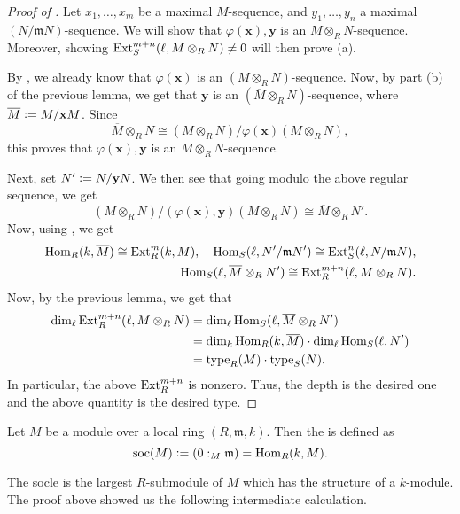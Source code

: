 \documentclass[12pt]{article}
\begin{document}
\begin{proof}[Proof of ]
	Let $x_{1}, \ldots, x_{m}$ be a maximal $M$-sequence, and $y_{1}, \ldots, y_{n}$ a maximal $(N/\mathfrak{m} N)$-sequence. We will show that $\varphi(\mathbf{x}), \mathbf{y}$ is an $M \otimes_{R} N$-sequence. Moreover, showing $\operatorname{Ext}_{S}^{m + n}(\ell, M \otimes_{R} N) \neq 0$ will then prove (a).

	By , we already know that $\varphi(\mathbf{x})$ is an $(M \otimes_{R} N)$-sequence. Now, by part (b) of the previous lemma, we get that $\mathbf{y}$ is an $(\overline{M} \otimes_{R} N)$-sequence, where $\overline{M} \vcentcolon= M/\mathbf{x} M$. Since
	\begin{equation*} 
		\overline{M} \otimes_{R} N \cong (M \otimes_{R} N)/\varphi(\mathbf{x})(M \otimes_{R} N),
	\end{equation*}
	this proves that $\varphi(\mathbf{x}), \mathbf{y}$ is an $M \otimes_{R} N$-sequence.

	Next, set $N' \vcentcolon= N/\mathbf{y} N$. We then see that going modulo the above regular sequence, we get
	\begin{equation*} 
		(M \otimes_{R} N)/(\varphi(\mathbf{x}), \mathbf{y})(M \otimes_{R} N) \cong \overline{M} \otimes_{R} N'.
	\end{equation*}
	Now, using , we get
	\begin{align*} 
		\operatorname{Hom}_{R}(k, \overline{M}) \cong \operatorname{Ext}_{R}^{m}(k, M), \quad \operatorname{Hom}_{S}(\ell, N'/\mathfrak{m} N') \cong \operatorname{Ext}_{S}^{n}(\ell, N/\mathfrak{m} N), \\
		\operatorname{Hom}_{S}(\ell, \overline{M} \otimes_{R} N') \cong \operatorname{Ext}_{R}^{m + n}(\ell, M \otimes_{R} N).
	\end{align*}
	Now, by the previous lemma, we get that
	\begin{align*} 
		\dim_{\ell} \operatorname{Ext}_{R}^{m + n}(\ell, M \otimes_{R} N) &= \dim_{\ell} \operatorname{Hom}_{S}(\ell, \overline{M} \otimes_{R} N') \\
		&= \dim_{k} \operatorname{Hom}_{R}(k, \overline{M}) \cdot \dim_{\ell} \operatorname{Hom}_{S}(\ell, N') \\
		&= \operatorname{type}_{R}(M) \cdot \operatorname{type}_{S}(N).
	\end{align*}
	In particular, the above $\operatorname{Ext}_{R}^{m + n}$ is nonzero. Thus, the depth is the desired one and the above quantity is the desired type.
\end{proof}

\begin{defn}
	Let $M$ be a module over a local ring $(R, \mathfrak{m}, k)$. Then the  is defined as
	\begin{equation*} 
		\operatorname{soc}(M) \vcentcolon= (0 :_{M} \mathfrak{m}) = \operatorname{Hom}_{R}(k, M).
	\end{equation*}
\end{defn}
The socle is the largest $R$-submodule of $M$ which has the structure of a $k$-module. The proof above showed us the following intermediate calculation.
\end{document}

